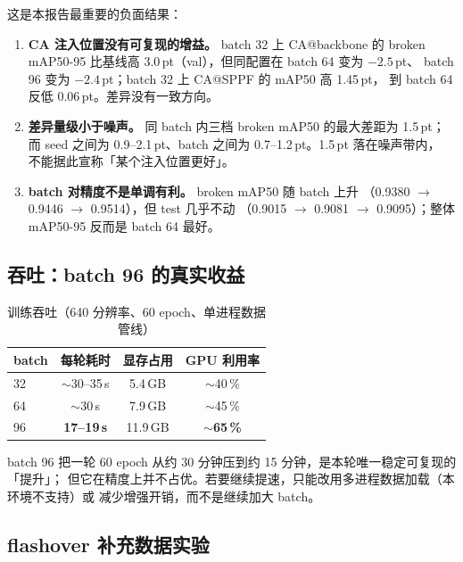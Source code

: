 \documentclass[UTF8,a4paper,11pt]{ctexart}
\begin{document}
这是本报告最重要的负面结果：

\begin{enumerate}[label=(\arabic*)]
  \item \textbf{CA 注入位置没有可复现的增益。} batch 32 上 CA@backbone 的
        broken mAP50-95 比基线高 3.0\,pt（val），但同配置在 batch 64 变为 $-2.5$\,pt、
        batch 96 变为 $-2.4$\,pt；batch 32 上 CA@SPPF 的 mAP50 高 1.45\,pt，
        到 batch 64 反低 0.06\,pt。差异没有一致方向。
  \item \textbf{差异量级小于噪声。} 同 batch 内三档 broken mAP50 的最大差距为 1.5\,pt；
        而 seed 之间为 0.9--2.1\,pt、batch 之间为 0.7--1.2\,pt。1.5\,pt 落在噪声带内，
        不能据此宣称「某个注入位置更好」。
  \item \textbf{batch 对精度不是单调有利。} broken mAP50 随 batch 上升
        （0.9380 $\to$ 0.9446 $\to$ 0.9514），但 test 几乎不动
        （0.9015 $\to$ 0.9081 $\to$ 0.9095）；整体 mAP50-95 反而是 batch 64 最好。
\end{enumerate}

\subsection{吞吐：batch 96 的真实收益}
\label{sec:speed}

\begin{table}[htbp]
\centering
\caption{训练吞吐（640 分辨率、60 epoch、单进程数据管线）}
\begin{tabular}{lccc}
\toprule
batch & 每轮耗时 & 显存占用 & GPU 利用率 \\
\midrule
32 & $\sim$30--35\,s & 5.4\,GB & $\sim$40\,\% \\
64 & $\sim$30\,s      & 7.9\,GB & $\sim$45\,\% \\
96 & \textbf{17--19\,s} & 11.9\,GB & \textbf{$\sim$65\,\%} \\
\bottomrule
\end{tabular}
\end{table}

batch 96 把一轮 60 epoch 从约 30 分钟压到约 15 分钟，是本轮唯一稳定可复现的「提升」；
但它在精度上并不占优。若要继续提速，只能改用多进程数据加载（本环境不支持）或
减少增强开销，而不是继续加大 batch。

\subsection{flashover 补充数据实验}
\end{document}
